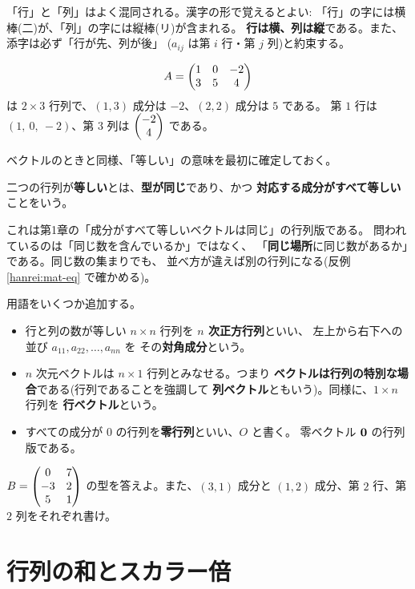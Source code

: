 \begin{chui}
「行」と「列」はよく混同される。漢字の形で覚えるとよい:
「行」の字には横棒(二)が、「列」の字には縦棒(リ)が含まれる。
\textbf{行は横、列は縦}である。また、添字は必ず「行が先、列が後」
($a_{ij}$ は第 $i$ 行・第 $j$ 列)と約束する。
\end{chui}

\begin{rei}
\[
A = \begin{pmatrix}1 & 0 & -2 \\ 3 & 5 & 4\end{pmatrix}
\]
は $2 \times 3$ 行列で、$(1,3)$ 成分は $-2$、$(2,2)$ 成分は $5$ である。
第 $1$ 行は $(1,\ 0,\ -2)$、第 $3$ 列は $\begin{pmatrix}-2 \\ 4\end{pmatrix}$ である。
\end{rei}

ベクトルのときと同様、「等しい」の意味を最初に確定しておく。

\begin{teigi}[行列の相等]
二つの行列が\textbf{等しい}とは、\textbf{型が同じ}であり、かつ
\textbf{対応する成分がすべて等しい}ことをいう。
\end{teigi}

これは第1章の「成分がすべて等しいベクトルは同じ」の行列版である。
問われているのは「同じ数を含んでいるか」ではなく、
「\textbf{同じ場所}に同じ数があるか」である。同じ数の集まりでも、
並べ方が違えば別の行列になる(反例 \ref{hanrei:mat-eq} で確かめる)。

用語をいくつか追加する。
\begin{itemize}
\item 行と列の数が等しい $n \times n$ 行列を \textbf{$n$ 次正方行列}といい、
左上から右下への並び $a_{11}, a_{22}, \dots, a_{nn}$ を
その\textbf{対角成分}という。
\item $n$ 次元ベクトルは $n \times 1$ 行列とみなせる。つまり
\textbf{ベクトルは行列の特別な場合}である(行列であることを強調して
\textbf{列ベクトル}ともいう)。同様に、$1 \times n$ 行列を
\textbf{行ベクトル}という。
\item すべての成分が $0$ の行列を\textbf{零行列}といい、$O$ と書く。
零ベクトル $\bm{0}$ の行列版である。
\end{itemize}

\begin{mondai}\label{q:matread}
$B = \begin{pmatrix}0 & 7 \\ -3 & 2 \\ 5 & 1\end{pmatrix}$ の型を答えよ。また、$(3,1)$ 成分と
$(1,2)$ 成分、第 $2$ 行、第 $2$ 列をそれぞれ書け。
\end{mondai}

\section{行列の和とスカラー倍}

